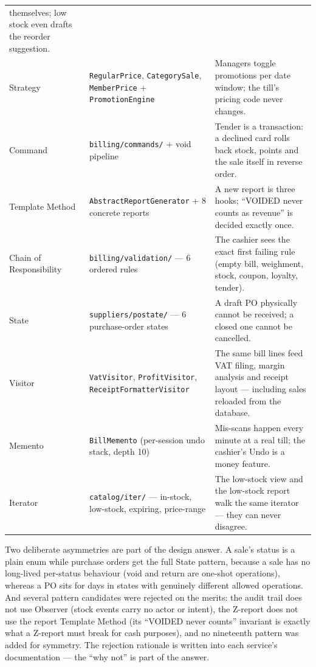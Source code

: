 \documentclass[12pt,a4paper]{report}
\begin{document}
\begin{longtable}{p{2.9cm}p{4.3cm}p{7.2cm}}
themselves; low stock even drafts the reorder suggestion. \\
Strategy & \texttt{RegularPrice}, \texttt{CategorySale}, \texttt{MemberPrice} +
\texttt{PromotionEngine} & Managers toggle promotions per date window; the till's pricing
code never changes. \\
Command & \texttt{billing/commands/} + void pipeline & Tender is a transaction: a
declined card rolls back stock, points and the sale itself in reverse order. \\
Template Method & \texttt{AbstractReportGenerator} + 8 concrete reports & A new report
is three hooks; ``VOIDED never counts as revenue'' is decided exactly once. \\
Chain of Responsibility & \texttt{billing/validation/} --- 6 ordered rules & The cashier
sees the exact first failing rule (empty bill, weighment, stock, coupon, loyalty,
tender). \\
State & \texttt{suppliers/postate/} --- 6 purchase-order states & A draft PO physically
cannot be received; a closed one cannot be cancelled. \\
Visitor & \texttt{VatVisitor}, \texttt{ProfitVisitor},
\texttt{ReceiptFormatterVisitor} & The same bill lines feed VAT filing, margin analysis
and receipt layout --- including sales reloaded from the database. \\
Memento & \texttt{BillMemento} (per-session undo stack, depth 10) & Mis-scans happen
every minute at a real till; the cashier's Undo is a money feature. \\
Iterator & \texttt{catalog/iter/} --- in-stock, low-stock, expiring, price-range & The
low-stock view and the low-stock report walk the same iterator --- they can never
disagree. \\
\end{longtable}

Two deliberate asymmetries are part of the design answer. A sale's status is a plain enum
while purchase orders get the full State pattern, because a sale has no long-lived
per-status behaviour (void and return are one-shot operations), whereas a PO sits for days
in states with genuinely different allowed operations. And several pattern candidates
were rejected on the merits: the audit trail does not use Observer (stock events carry no
actor or intent), the Z-report does not use the report Template Method (its
``VOIDED never counts'' invariant is exactly what a Z-report must break for cash
purposes), and no nineteenth pattern was added for symmetry. The rejection rationale is
written into each service's documentation --- the ``why not'' is part of the answer.
\end{document}
